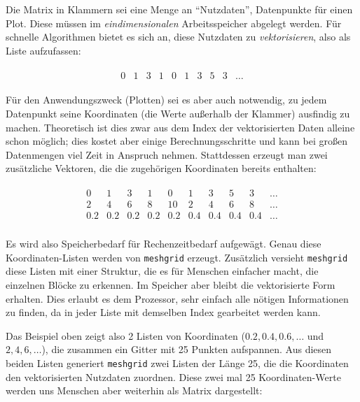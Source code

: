 Die Matrix in Klammern sei eine Menge an \enquote{Nutzdaten}, \eg Datenpunkte für einen Plot. Diese müssen im \emph{eindimensionalen} Arbeitsspeicher abgelegt werden. Für schnelle Algorithmen bietet es sich an, diese Nutzdaten zu \emph{vektorisieren}, also als Liste aufzufassen:

\begin{align*}
	\begin{matrix}
		0 & 1 & 3 & 1 & 0 & 1 & 3 & 5 & 3 & \ldots
	\end{matrix}
\end{align*}

Für den Anwendungszweck (\eg Plotten) sei es aber auch notwendig, zu jedem Datenpunkt seine Koordinaten (die Werte außerhalb der Klammer) ausfindig zu machen. Theoretisch ist dies zwar aus dem Index der vektorisierten Daten alleine schon möglich; dies kostet aber einige Berechnungsschritte und kann bei großen Datenmengen viel Zeit in Anspruch nehmen. Stattdessen erzeugt man zwei zusätzliche Vektoren, die die zugehörigen Koordinaten bereits enthalten:

\begin{align*}
	\begin{matrix}
		0   &   1 &   3 &   1 &   0 &   1 &   3 & 5   &   3 & \ldots \\
		 2  &  4  &  6  &  8  &  10 &  2  &  4  &  6  &  8  & \ldots \\
		0.2 & 0.2 & 0.2 & 0.2 & 0.2 & 0.4 & 0.4 & 0.4 & 0.4 & \ldots \\
	\end{matrix}
\end{align*}

Es wird also Speicherbedarf für Rechenzeitbedarf aufgewägt. Genau diese Koordinaten-Listen werden von \texttt{meshgrid} erzeugt. Zusätzlich versieht \texttt{meshgrid} diese Listen mit einer Struktur, die es für Menschen einfacher macht, die einzelnen Blöcke zu erkennen. Im Speicher aber bleibt die vektorisierte Form erhalten. Dies erlaubt es dem Prozessor, sehr einfach alle nötigen Informationen zu finden, da in jeder Liste mit demselben Index gearbeitet werden kann.

Das Beispiel oben zeigt also 2 Listen von Koordinaten ($0.2, 0.4, 0.6, \ldots$ und $2, 4, 6, \ldots$), die zusammen ein Gitter mit 25 Punkten aufspannen. Aus diesen beiden Listen generiert \texttt{meshgrid} zwei Listen der Länge 25, die die Koordinaten den vektorisierten Nutzdaten zuordnen. Diese zwei mal 25 Koordinaten-Werte werden uns Menschen aber weiterhin als Matrix dargestellt:

